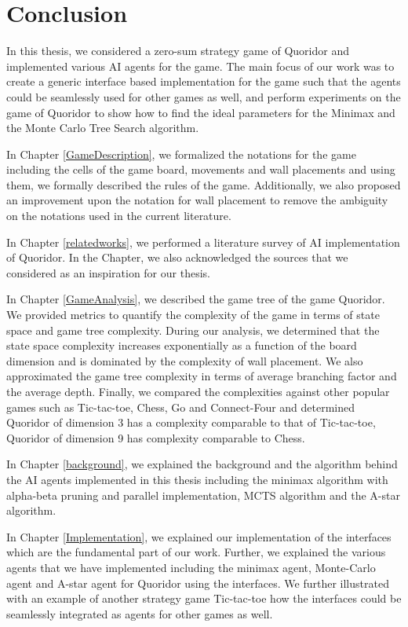 \chapter{Conclusion}\label{Conclusion}

In this thesis, we considered a zero-sum strategy game of Quoridor and implemented various AI agents for the game. The main focus of our work was to create a generic interface based implementation for the game such that the agents could be seamlessly used for other games as well, and perform experiments on the game of Quoridor to show how to find the ideal parameters for the Minimax and the Monte Carlo Tree Search algorithm.

In Chapter \ref{GameDescription}, we formalized the notations for the game including the cells of the game board, movements and wall placements and using them, we formally described the rules of the game. Additionally, we also proposed an improvement upon the notation for wall placement to remove the ambiguity on the notations used in the current literature.

In Chapter \ref{relatedworks}, we performed a literature survey of \gls{AI} implementation of Quoridor. In the Chapter, we also acknowledged the sources that we considered as an inspiration for our thesis. 

In Chapter \ref{GameAnalysis}, we described the game tree of the game Quoridor. We provided metrics to quantify the complexity of the game in terms of state space and game tree complexity. During our analysis, we determined that the state space complexity increases exponentially as a function of the board dimension and is dominated by the complexity of wall placement. We also approximated the game tree complexity in terms of average branching factor and the average depth. Finally, we compared the complexities against other popular games such as Tic-tac-toe, Chess, Go and Connect-Four and determined Quoridor of dimension 3 has a complexity comparable to that of Tic-tac-toe, Quoridor of dimension 9 has complexity comparable to Chess.

In Chapter \ref{background}, we explained the background and the algorithm behind the AI agents implemented in this thesis including the minimax algorithm with alpha-beta pruning and parallel implementation, \gls{MCTS} algorithm and the A-star algorithm.

In Chapter \ref{Implementation}, we explained our implementation of the interfaces which are the fundamental part of our work. Further, we explained the various agents that we have implemented including the minimax agent, Monte-Carlo agent and A-star agent for Quoridor using the interfaces. We further illustrated with an example of another strategy game Tic-tac-toe how the interfaces could be seamlessly integrated as agents for other games as well. 

